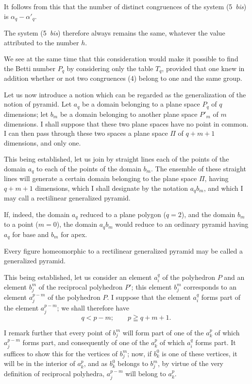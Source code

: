 \documentclass{article}
\begin{document}
It follows from this that the number of distinct congruences of the system (5~\emph{bis}) is $\alpha_{q} - \alpha'_{q}$.

The system (5~\emph{bis}) therefore always remains the same, whatever the value attributed to the number $h$.

We see at the same time that this consideration would make it possible to find the Betti number $P_{q}$ by considering only the table $T_{q}$, provided that one knew in addition whether or not two congruences (4) belong to one and the same group.

Let us now introduce a notion which can be regarded as the generalization of the notion of pyramid. Let $a_{q}$ be a domain belonging to a plane space $P_{q}$ of $q$ dimensions; let $b_{m}$ be a domain belonging to another plane space $P'_{m}$ of $m$ dimensions. I shall suppose that these two plane spaces have no point in common. I can then pass through these two spaces a plane space $\Pi$ of $q+m+1$ dimensions, and only one.

This being established, let us join by straight lines each of the points of the domain $a_{q}$ to each of the points of the domain $b_{m}$. The ensemble of these straight lines will generate a certain domain belonging to the plane space $\Pi$, having $q+m+1$ dimensions, which I shall designate by the notation $a_{q} b_{m}$, and which I may call a rectilinear generalized pyramid.

If, indeed, the domain $a_{q}$ reduced to a plane polygon ($q = 2$),
and the domain $b_{m}$ to a point ($m = 0$), the domain $a_{q} b_{m}$ would reduce to an ordinary pyramid having $a_{q}$ for base and $b_{m}$ for apex.

Every figure homeomorphic to a rectilinear generalized pyramid may be called a generalized pyramid.

This being established, let us consider an element $a^{q}_{i}$ of the polyhedron $P$ and an element $b^{m}_{j}$ of the reciprocal polyhedron $P'$; this element $b^{m}_{j}$ corresponds to an element $a^{p-m}_{j}$ of the polyhedron $P$. I suppose that the element $a^{q}_{i}$ forms part of the element $a^{p-m}_{j}$; we shall therefore have
\[ q < p-m; \qquad p \geqq q+m+1. \]

I remark further that every point of $b^{m}_{j}$ will form part of one of the $a^{p}_{k}$ of which $a^{p-m}_{j}$ forms part, and consequently of one of the $a^{p}_{k}$ of which $a^{q}_{i}$ forms part. It suffices to show this for the vertices of $b^{m}_{j}$; now, if $b^{0}_{k}$ is one of these vertices, it will be in the interior of $a^{p}_{k}$, and as $b^{0}_{k}$ belongs to $b^{m}_{j}$, by virtue of the very definition of reciprocal polyhedra, $a^{p-m}_{j}$ will belong to $a^{p}_{k}$.
\end{document}
